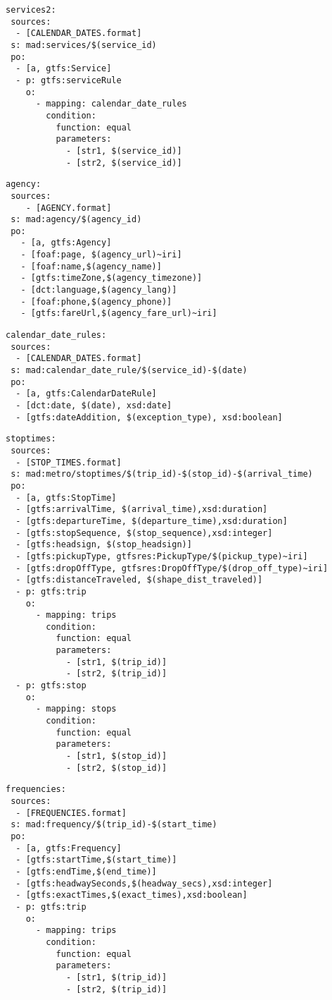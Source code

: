 \begin{lstlisting}[caption=Service\_Calendar\_Date TripleMap, label=lst:service2, basicstyle=\small,frame=single]
services2:
 sources:
  - [CALENDAR_DATES.format]
 s: mad:services/$(service_id)
 po:
  - [a, gtfs:Service]
  - p: gtfs:serviceRule
    o:
      - mapping: calendar_date_rules
        condition:
          function: equal
          parameters:
            - [str1, $(service_id)]
            - [str2, $(service_id)]
\end{lstlisting}
\begin{lstlisting}[caption=Agency TripleMap, label=lst:agency, basicstyle=\small,frame=single]
agency:
 sources:
    - [AGENCY.format]
 s: mad:agency/$(agency_id)
 po:
   - [a, gtfs:Agency]
   - [foaf:page, $(agency_url)~iri]
   - [foaf:name,$(agency_name)]
   - [gtfs:timeZone,$(agency_timezone)]
   - [dct:language,$(agency_lang)]
   - [foaf:phone,$(agency_phone)]
   - [gtfs:fareUrl,$(agency_fare_url)~iri]
\end{lstlisting}
\begin{lstlisting}[caption=Calendar\_Date\_Rules TripleMap, label=lst:calendarDateRules, basicstyle=\small,frame=single]
calendar_date_rules:
 sources:
  - [CALENDAR_DATES.format]
 s: mad:calendar_date_rule/$(service_id)-$(date)
 po:
  - [a, gtfs:CalendarDateRule]
  - [dct:date, $(date), xsd:date]
  - [gtfs:dateAddition, $(exception_type), xsd:boolean]
\end{lstlisting}
\begin{lstlisting}[caption=Stop\_Times TripleMap, label=lst:stoptimes, basicstyle=\small,frame=single]
stoptimes:
 sources:
  - [STOP_TIMES.format]
 s: mad:metro/stoptimes/$(trip_id)-$(stop_id)-$(arrival_time)
 po:
  - [a, gtfs:StopTime]
  - [gtfs:arrivalTime, $(arrival_time),xsd:duration]
  - [gtfs:departureTime, $(departure_time),xsd:duration]
  - [gtfs:stopSequence, $(stop_sequence),xsd:integer]
  - [gtfs:headsign, $(stop_headsign)]
  - [gtfs:pickupType, gtfsres:PickupType/$(pickup_type)~iri]
  - [gtfs:dropOffType, gtfsres:DropOffType/$(drop_off_type)~iri]
  - [gtfs:distanceTraveled, $(shape_dist_traveled)]
  - p: gtfs:trip
    o:
      - mapping: trips
        condition:
          function: equal
          parameters:
            - [str1, $(trip_id)]
            - [str2, $(trip_id)]
  - p: gtfs:stop
    o:
      - mapping: stops
        condition:
          function: equal
          parameters:
            - [str1, $(stop_id)]
            - [str2, $(stop_id)]
\end{lstlisting}
\begin{lstlisting}[caption=Frequencies TripleMap, label=lst:frequencies, basicstyle=\small,frame=single]
frequencies:
 sources:
  - [FREQUENCIES.format]
 s: mad:frequency/$(trip_id)-$(start_time)
 po:
  - [a, gtfs:Frequency]
  - [gtfs:startTime,$(start_time)]
  - [gtfs:endTime,$(end_time)]
  - [gtfs:headwaySeconds,$(headway_secs),xsd:integer]
  - [gtfs:exactTimes,$(exact_times),xsd:boolean]
  - p: gtfs:trip
    o:
      - mapping: trips
        condition:
          function: equal
          parameters:
            - [str1, $(trip_id)]
            - [str2, $(trip_id)]
\end{lstlisting}

